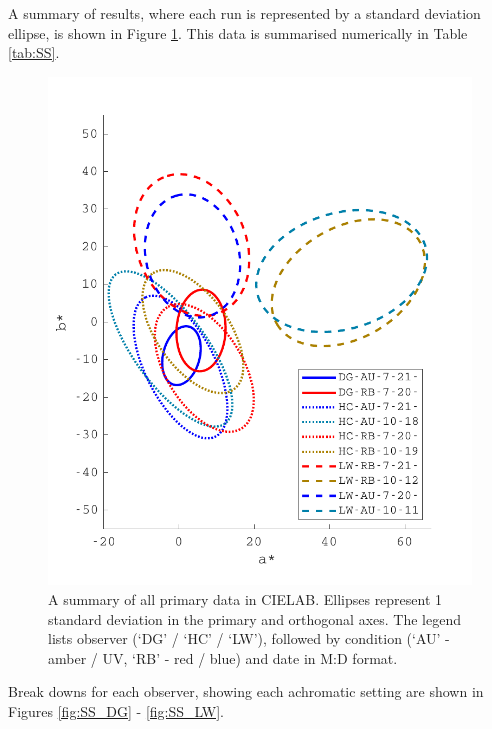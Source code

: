 A summary of results, where each run is represented by a standard deviation ellipse, is shown in Figure \ref{fig:SSsummary}. This data is summarised numerically in Table \ref{tab:SS}.
%
\begin{figure}[htbp]
\includegraphics[max width=1.2\textwidth,center]{figs/SmallSphere/SSsummary.pdf}
\caption{A summary of all primary data in CIELAB. Ellipses represent 1 standard deviation in the primary and orthogonal axes. The legend lists observer (`DG' / `HC' / `LW'), followed by condition (`AU' - amber / UV, `RB' - red / blue) and date in M:D format.}
\label{fig:SSsummary}
\end{figure}
%
Break downs for each observer, showing each achromatic setting are shown in Figures \ref{fig:SS_DG} - \ref{fig:SS_LW}.

